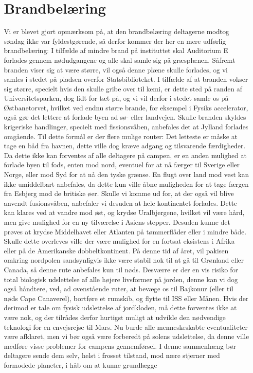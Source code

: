 

\begin{minipage}[b]{0.95\linewidth}
\begin{minipage}[t]{0.47\textwidth}
\vspace{3mm}
\section*{Brandbelæring}
Vi er blevet gjort opmærksom på, at den brandbelæring deltagerne modtog søndag ikke var fyldestgørende, så derfor kommer der her en mere udførlig brandbelæring: I tilfælde af mindre brand på instituttet skal Auditorium E forlades gennem nødudgangene og alle skal samle sig på græsplænen. Såfremt branden viser sig at være større, vil også denne plæne skulle forlades, og vi samles i stedet på pladsen overfor Statsbiblioteket. I tilfælde af at branden vokser sig større, specielt hvis den skulle gribe over til kemi, er dette sted på randen af Universitetsparken, dog lidt for tæt på, og vi vil derfor i stedet samle os på Østbanetorvet, hvilket ved endnu større brande, for eksempel i Fysiks accelerator, også gør det lettere at forlade byen ad sø- eller landvejen. Skulle branden skyldes krigeriske handlinger, specielt med fissionsvåben, anbefales det at Jylland forlades omgående. Til dette formål er der flere mulige router: Det letteste er måske at tage en båd fra havnen, dette ville dog kræve adgang og tilsvarende færdigheder. Da dette ikke kan forventes af alle deltagere på campen, er en anden mulighed at forlade byen til fods, enten mod nord, eventuel for at nå færger til Sverige eller Norge, eller mod Syd for at nå den tyske grænse. En flugt over land mod vest kan ikke umiddelbart anbefales, da dette kun ville åbne muligheden for at tage færgen fra Esbjerg mod de britiske øer. Skulle vi komme ud for, at der også vil blive anvendt fusionsvåben, anbefaler vi desuden at hele kontinentet forlades. Dette kan klares ved at vandre mod øst, og krydse Uralbjergene, hvilket vil være hård, men give mulighed for en ny tilværelse i Asiens stepper. Desuden kunne det prøves at krydse Middelhavet eller Atlanten på tømmerflåder eller i mindre både. Skulle dette overleves ville der være mulighed for en fortsat eksistens i Afrika eller på de Amerikanske dobbeltkontinent. På denne tid af året, vil pakisen omkring nordpolen sandsynligvis ikke være stabil nok til at gå til Grønland eller Canada, så denne rute anbefales kun til nøds. Desværre er der en vis risiko for total biologisk udslettelse af alle højere livsformer på jorden, denne kan vi dog også håndtere, ved, ad ovenstående ruter, at bevæge os til Bajkonur (eller til nøds Cape Canaverel), bortføre et rumskib, og flytte til ISS eller Månen. Hvis der derimod er tale om fysisk udslettelse af jordkloden, må dette forventes ikke at være nok, og der tilrådes derfor hurtigst muligt at udvikle den nødvendige teknologi for en envejsrejse til Mars. Nu burde alle menneskeskabte eventualiteter være afklaret, men vi bør også være forberedt på solens udslettelse, da denne ville medføre visse problemer for campens gennemførsel. I denne sammenhæng bør deltagere sende dem selv, helst i frosset tilstand, mod nære stjerner med formodede planeter, i håb om at kunne grundlægge 
\end{minipage}
\end{minipage}

